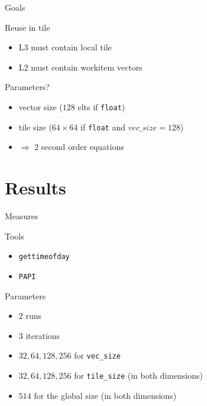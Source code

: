 \documentclass[10pt, compress]{beamer}
\begin{document}
\begin{frame}[fragile]{Goals}

\begin{block}{Reuse in tile}
\begin{itemize}
\item L3 must contain local tile
\item L2 must contain workitem vectors
\end{itemize}
\end{block}

\begin{block}{Parameters?}
\begin{itemize}
\item vector size ($128$ elts if \verb!float!)
\item tile size ($64 \times 64$ if \verb!float! and $vec\_size = 128$)
\item $\Rightarrow$ 2 second order equations
\end{itemize}
\end{block}

\end{frame}

\section{Results}

\begin{frame}[fragile]{Measures}

\begin{block}{Tools}
\begin{itemize}
\item \verb!gettimeofday!
\item \verb!PAPI!
\end{itemize}
\end{block}

\begin{block}{Parameters}
\begin{itemize}
\item $2$ runs
\item $3$ iterations
\item $32, 64, 128, 256$ for \verb!vec_size!
\item $32, 64, 128, 256$ for \verb!tile_size! (in both dimensions)
\item $514$ for the global size (in both dimensions)
\end{itemize}
\end{block}

\end{frame}
\end{document}
